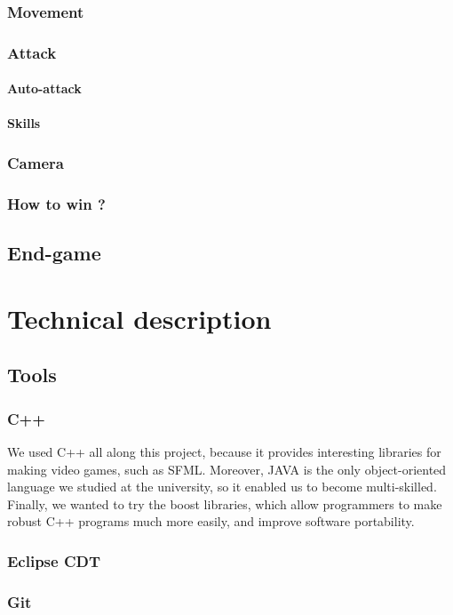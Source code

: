 \documentclass{scrreprt}
\begin{document}
		  \section{Movement}
		  \section{Attack}
		  \subsection{Auto-attack}
		  \subsection{Skills}
		  \section{Camera}
		  \section{How to win ?}
		  \chapter{End-game}

		  \part{Technical description}
		  \chapter{Tools}
		  \section{C++}
		  We used C++ all along this project, because it provides interesting libraries for making video games, such as SFML.
		  Moreover, JAVA is the only object-oriented language we studied at the university, so it enabled us to become multi-skilled.
		  Finally, we wanted to try the boost libraries, which allow programmers to make robust C++ programs much more easily, and improve
		  software portability.
		  \section{Eclipse CDT}
		  \section{Git}
\end{document}
